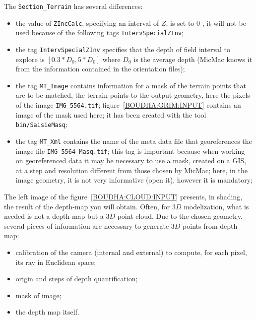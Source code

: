 The {\tt Section\_Terrain} has several differences:


\begin{itemize}
   \item  the value of {\tt ZIncCalc}, specifying an interval of $Z$, is set
          to $0$ , it will not be used because of the following tags {\tt IntervSpecialZInv};

   \item  the tag {\tt IntervSpecialZInv} specifies that the depth of field interval to
          explore is $[0.3*D_0, 5*D_0]$ where $D_0$ is the average depth (MicMac knows it
          from the information contained in the orientation files);

     \item the tag {\tt MT\_Image} contains information for a mask of the terrain points
        that are to be matched, the terrain points  to the output geometry,
           here the pixels of the image {\tt IMG\_5564.tif}; figure~\ref{BOUDHA:GRIM:INPUT}
           contains an image of the mask used here; it has been created with the
           tool {\tt bin/SaisieMasq};

     \item the tag {\tt MT\_Xml} contains the name of the meta data file that georeferences
           the image file {\tt IMG\_5564\_Masq.tif}; this tag is important because
           when working on georeferenced data it may be necessary to use a mask,
           created on a GIS, at a step and resolution different from those chosen
           by MicMac; here, in the image geometry, it is not very informative (open it),
           however it is mandatory;
\end{itemize}




The left image of the figure~\ref{BOUDHA:CLOUD:INPUT} presents, in shading,
the result of the depth-map you will obtain. Often,  for $3D$ modelization,
what is needed is not a depth-map but a $3D$ point cloud. Due to the chosen geometry,
several pieces of information are necessary to generate $3D$ points from
depth map:


\begin{itemize}
  \item  calibration of the camera (internal and external) to compute, for
         each pixel, its ray in Euclidean space;
  \item  origin and steps of depth quantification;
  \item  mask of image;
  \item   the depth map itself.
\end{itemize}



